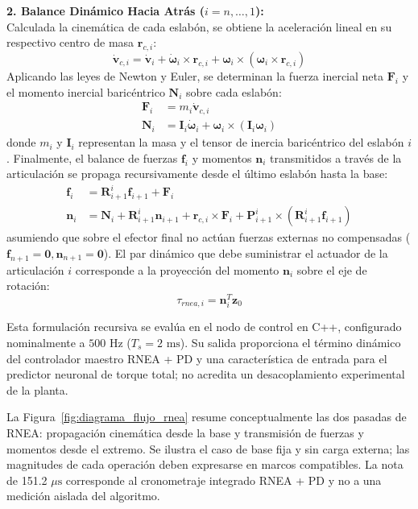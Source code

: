 \documentclass[12pt]{article}
\begin{document}
\textbf{2. Balance Dinámico Hacia Atrás ($i = n, \dots, 1$):} \\
Calculada la cinemática de cada eslabón, se obtiene la aceleración lineal en su respectivo centro de masa $\bm{r}_{c,i}$:
\begin{equation}
\dot{\bm{v}}_{c,i} = \dot{\bm{v}}_i + \dot{\bm{\omega}}_i \times \bm{r}_{c,i} + \bm{\omega}_i \times \left(\bm{\omega}_i \times \bm{r}_{c,i}\right)
\label{eq:rnea_dvcom}
\end{equation}
Aplicando las leyes de Newton y Euler, se determinan la fuerza inercial neta $\bm{F}_i$ y el momento inercial baricéntrico $\bm{N}_i$ sobre cada eslabón:
\begin{align}
\bm{F}_i &= m_i \dot{\bm{v}}_{c,i} \label{eq:rnea_Fi} \\
\bm{N}_i &= \bm{I}_i \dot{\bm{\omega}}_i + \bm{\omega}_i \times \left(\bm{I}_i \bm{\omega}_i\right) \label{eq:rnea_Ni}
\end{align}
donde $m_i$ y $\bm{I}_i$ representan la masa y el tensor de inercia baricéntrico del eslabón $i$. Finalmente, el balance de fuerzas $\bm{f}_i$ y momentos $\bm{n}_i$ transmitidos a través de la articulación se propaga recursivamente desde el último eslabón hasta la base:
\begin{align}
\bm{f}_i &= \bm{R}_{i+1}^i \bm{f}_{i+1} + \bm{F}_i \label{eq:rnea_fi} \\
\bm{n}_i &= \bm{N}_i + \bm{R}_{i+1}^i \bm{n}_{i+1} + \bm{r}_{c,i} \times \bm{F}_i + \bm{P}_{i+1}^i \times \left(\bm{R}_{i+1}^i \bm{f}_{i+1}\right) \label{eq:rnea_ni}
\end{align}
asumiendo que sobre el efector final no actúan fuerzas externas no compensadas ($\bm{f}_{n+1} = \bm{0}, \bm{n}_{n+1} = \bm{0}$). El par dinámico que debe suministrar el actuador de la articulación $i$ corresponde a la proyección del momento $\bm{n}_i$ sobre el eje de rotación:
\begin{equation}
\tau_{rnea, i} = \bm{n}_i^T \bm{z}_0
\label{eq:rnea_tau}
\end{equation}

Esta formulación recursiva se evalúa en el nodo de control en C++, configurado nominalmente a $500\text{ Hz}$ ($T_s = 2\text{ ms}$). Su salida proporciona el término dinámico del controlador maestro RNEA + PD y una característica de entrada para el predictor neuronal de torque total; no acredita un desacoplamiento experimental de la planta.

La Figura~\ref{fig:diagrama_flujo_rnea} resume conceptualmente las dos pasadas de RNEA: propagación cinemática desde la base y transmisión de fuerzas y momentos desde el extremo. Se ilustra el caso de base fija y sin carga externa; las magnitudes de cada operación deben expresarse en marcos compatibles. La nota de 151.2 $\mu\text{s}$ corresponde al cronometraje integrado RNEA + PD y no a una medición aislada del algoritmo.
\end{document}
